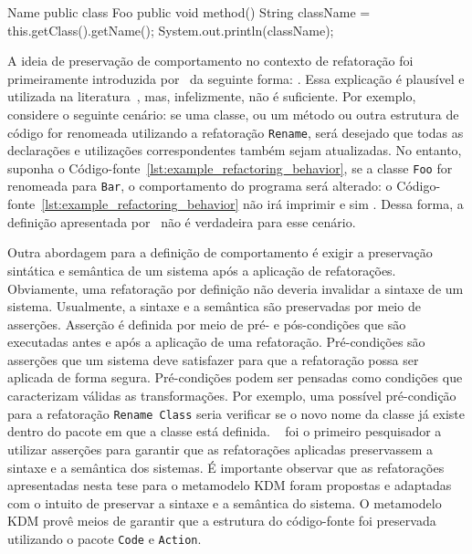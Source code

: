 \begin{codigo}[caption={[Um simples programa ilustrando porque é errado acreditar que refatoração não muda a saída de um programa.] Simples exemplo do efeito de uma refatoração.},escapeinside={(*@}{@*)}, basicstyle=\footnotesize, language=java, label={lst:example_refactoring_behavior}]{Name}
	public class Foo {
	    public void method(){
	        String className = this.getClass().getName();
	        System.out.println(className);
	    }
	}
\end{codigo}

A ideia de preservação de comportamento no contexto de refatoração foi primeiramente introduzida por~ da seguinte forma: . Essa explicação é plausível e utilizada na literatura~\cite{Roberts_1999, Fowler1999}, mas, infelizmente, não é suficiente. Por exemplo, considere o seguinte cenário: se uma classe, ou um método ou outra estrutura de código for renomeada utilizando a refatoração \texttt{Rename}, será desejado que todas as  declarações e utilizações correspondentes também sejam atualizadas. No entanto, suponha o Código-fonte~\ref{lst:example_refactoring_behavior}, se a classe \texttt{Foo} for renomeada para \texttt{Bar}, o comportamento do programa será alterado: o Código-fonte~\ref{lst:example_refactoring_behavior} não irá imprimir  e sim . Dessa forma, a definição apresentada por~ não é verdadeira para esse cenário.   


Outra abordagem para a definição de comportamento é exigir a preservação sintática e semântica de um sistema após a aplicação de refatorações. Obviamente, uma refatoração por definição não deveria invalidar a sintaxe de um sistema. Usualmente, a sintaxe e a semântica são preservadas por meio de asserções. Asserção é definida por meio de pré- e pós-condições que são executadas antes e após a aplicação de uma refatoração. Pré-condições são asserções que um sistema deve satisfazer para que a refatoração possa ser aplicada de forma segura. Pré-condições podem ser pensadas como condições que caracterizam válidas as transformações. Por exemplo, uma possível pré-condição para a refatoração \texttt{Rename Class} seria verificar se o novo nome da classe já existe dentro do pacote em que a classe está definida. ~ foi o primeiro pesquisador a utilizar asserções para garantir que as refatorações aplicadas preservassem a sintaxe e a semântica dos sistemas. É importante observar que as refatorações apresentadas nesta tese para o metamodelo KDM foram propostas e adaptadas com o intuito de preservar a sintaxe e a semântica do sistema. O metamodelo KDM provê meios de garantir que a estrutura do código-fonte foi preservada utilizando o pacote \texttt{Code} e \texttt{Action}.

